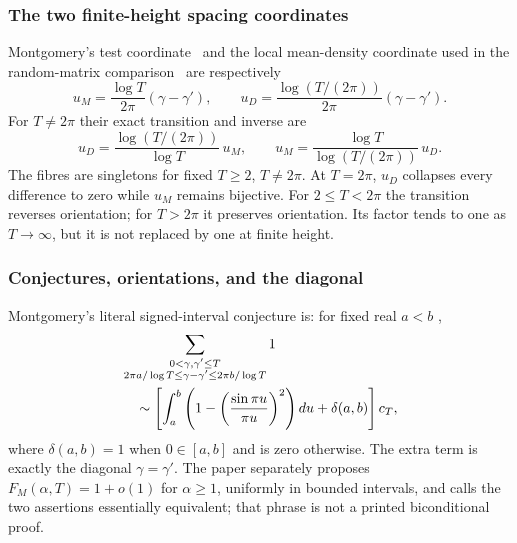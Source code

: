 \subsubsection{The two finite-height spacing coordinates}

Montgomery's test coordinate~\cite{montgomery1973} and the local mean-density coordinate
used in the random-matrix comparison~\cite{keatingSnaith2000} are respectively
\begin{equation}
 u_M=\frac{\log T}{2\pi}(\gamma-\gamma'),
 \qquad
 u_D=\frac{\log(T/(2\pi))}{2\pi}(\gamma-\gamma').
 \label{eq:two-unfoldings}
\end{equation}
For $T\neq2\pi$ their exact transition and inverse are
\begin{equation}
 u_D=\frac{\log(T/(2\pi))}{\log T}\,u_M,
 \qquad
 u_M=\frac{\log T}{\log(T/(2\pi))}\,u_D.
 \label{eq:unfolding-transition}
\end{equation}
The fibres are singletons for fixed $T\geq2$, $T\neq2\pi$.  At $T=2\pi$, $u_D$
collapses every difference to zero while $u_M$ remains bijective.  For
$2\leq T<2\pi$ the transition reverses orientation; for $T>2\pi$ it preserves
orientation.  Its factor tends to one as $T\to\infty$, but it is not replaced by one at
finite height.

\subsubsection{Conjectures, orientations, and the diagonal}

Montgomery's literal signed-interval conjecture is: for fixed real $a<b$
\cite[pp.~183--184, eqs.~(11)--(15)]{montgomery1973},
\begin{align}
 &\sum_{\substack{0<\gamma,\gamma'\leq T\\
  2\pi a/\log T\leq\gamma-\gamma'\leq2\pi b/\log T}}1 \notag\\
 &\quad\sim\left[
 \int_a^b\left(1-\left(\frac{\sin\pi u}{\pi u}\right)^2\right)du
 +\delta(a,b)\right]c_T,
 \label{eq:montgomery-signed-PCC}
\end{align}
where $\delta(a,b)=1$ when $0\in[a,b]$ and is zero otherwise.  The extra term is
exactly the diagonal $\gamma=\gamma'$.  The paper separately proposes
$F_M(\alpha,T)=1+o(1)$ for $\alpha\geq1$, uniformly in bounded intervals, and calls
the two assertions essentially equivalent; that phrase is not a printed biconditional proof.


